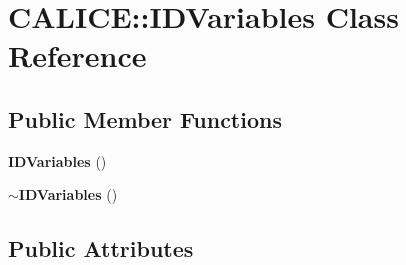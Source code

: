 \section{C\-A\-L\-I\-C\-E\-:\-:I\-D\-Variables Class Reference}
\label{classCALICE_1_1IDVariables}
\subsection*{Public Member Functions}
\begin{DoxyCompactItemize}
\item 
{\bf I\-D\-Variables} ()
\item 
{\bf $\sim$\-I\-D\-Variables} ()
\end{DoxyCompactItemize}
\subsection*{Public Attributes}
